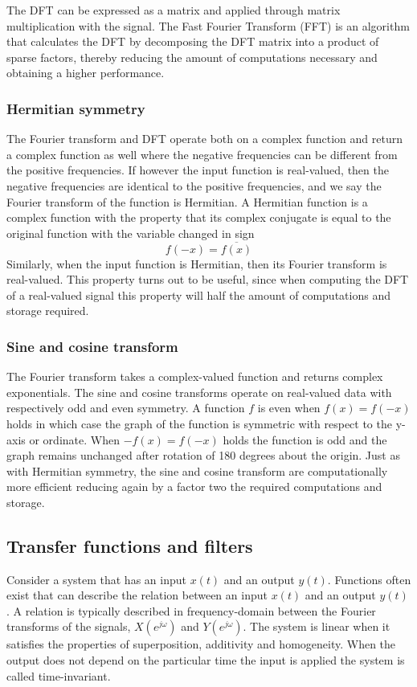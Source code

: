 The DFT can be expressed as a matrix and applied through matrix multiplication
with the signal. The Fast Fourier Transform (FFT) is an algorithm that
calculates the DFT by decomposing the DFT matrix into a product of sparse
factors, thereby reducing the amount of computations necessary and obtaining a
higher performance.


\subsubsection{Hermitian symmetry}
The Fourier transform and DFT operate both on a complex function and return a
complex function as well where the negative frequencies can be different from
the positive frequencies. If however the input function is real-valued, then the
negative frequencies are identical to the positive frequencies, and we say the
Fourier transform of the function is Hermitian. A Hermitian function is a
complex function with the property that its complex conjugate is equal to the
original function with the variable changed in sign
\begin{equation}
 f(-x) = \overline{f(x)}
\end{equation}
Similarly, when the input function is Hermitian, then its Fourier transform is
real-valued. This property turns out to be useful, since when computing the DFT
of a real-valued signal this property will half the amount of computations and
storage required.

\subsubsection{Sine and cosine transform}
The Fourier transform takes a complex-valued function and returns complex
exponentials. The sine and cosine transforms operate on real-valued data with
respectively odd and even symmetry. A function $f$ is even when $f(x)=f(-x)$
holds in which case the graph of the function is symmetric with respect to the
y-axis or ordinate. When $-f(x)=f(-x)$ holds the function is odd and the graph
remains unchanged after rotation of 180 degrees about the origin. Just as with
Hermitian symmetry, the sine and cosine transform are computationally more
efficient reducing again by a factor two the required computations and storage.



\subsection{Transfer functions and filters}
Consider a system that has an input $x(t)$ and an output $y(t)$. Functions often
exist that can describe the relation between an input $x(t)$ and an output
$y(t)$. A relation is typically described in frequency-domain between the
Fourier transforms of the signals, $X(e^{j\omega})$ and $Y(e^{j\omega})$.
The system is linear when it satisfies the properties of superposition,
additivity and homogeneity. When the output does not depend on the particular
time the input is applied the system is called time-invariant.

